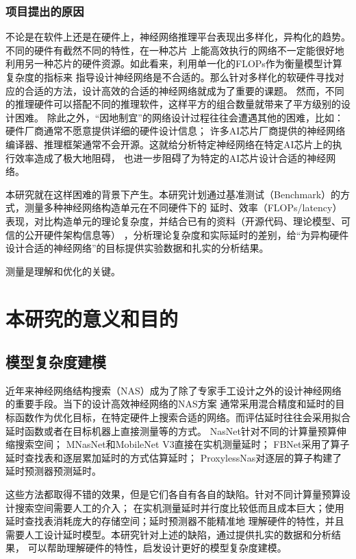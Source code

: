 \subsubsection{项目提出的原因}

不论是在软件上还是在硬件上，神经网络推理平台表现出多样化，异构化的趋势。不同的硬件有截然不同的特性，在一种芯片
上能高效执行的网络不一定能很好地利用另一种芯片的硬件资源。如此看来，利用单一化的FLOPs作为衡量模型计算复杂度的指标来
指导设计神经网络是不合适的。那么针对多样化的软硬件寻找对应的合适的方法，设计高效的合适的神经网络就成为了重要的课题。
然而，不同的推理硬件可以搭配不同的推理软件，这样平方的组合数量就带来了平方级别的设计困难。
除此之外，“因地制宜”的网络设计过程往往会遭遇其他的困难，比如：硬件厂商通常不愿意提供详细的硬件设计信息；
许多AI芯片厂商提供的神经网络编译器、推理框架通常不会开源。这就给分析特定神经网络在特定AI芯片上的执行效率造成了极大地阻碍，
也进一步阻碍了为特定的AI芯片设计合适的神经网络。

本研究就在这样困难的背景下产生。本研究计划通过基准测试（Benchmark）的方式，测量多种神经网络构造单元在不同硬件下的
延时、效率（FLOPs/latency）表现，对比构造单元的理论复杂度，并结合已有的资料（开源代码、理论模型、可信的公开硬件架构信息等）
，分析理论复杂度和实际延时的差别，给“为异构硬件设计合适的神经网络”的目标提供实验数据和扎实的分析结果。

测量是理解和优化的关键。

\section{本研究的意义和目的}

\subsection{模型复杂度建模}
近年来神经网络结构搜索（NAS）成为了除了专家手工设计之外的设计神经网络的重要手段。当下的设计高效神经网络的NAS方案
通常采用混合精度和延时的目标函数作为优化目标，在特定硬件上搜索合适的网络。而评估延时往往会采用拟合
延时函数或者在目标机器上直接测量等的方式。
NasNet\cite{zoph2018learning}针对不同的计算量预算伸缩搜索空间；
MNasNet\cite{tan2019mnasnet}和MobileNet V3\cite{howard2019searching}直接在实机测量延时；
FBNet\cite{wu2019fbnet}采用了算子延时查找表和逐层累加延时的方式估算延时；
ProxylessNas\cite{cai2018proxylessnas}对逐层的算子构建了延时预测器预测延时。

这些方法都取得不错的效果，但是它们各自有各自的缺陷。针对不同计算量预算设计搜索空间需要人工的介入；
在实机测量延时并行度比较低而且成本巨大；使用延时查找表消耗庞大的存储空间；延时预测器不能精准地
理解硬件的特性，并且需要人工设计延时模型。本研究针对上述的缺陷，通过提供扎实的数据和分析结果，
可以帮助理解硬件的特性，启发设计更好的模型复杂度建模。

